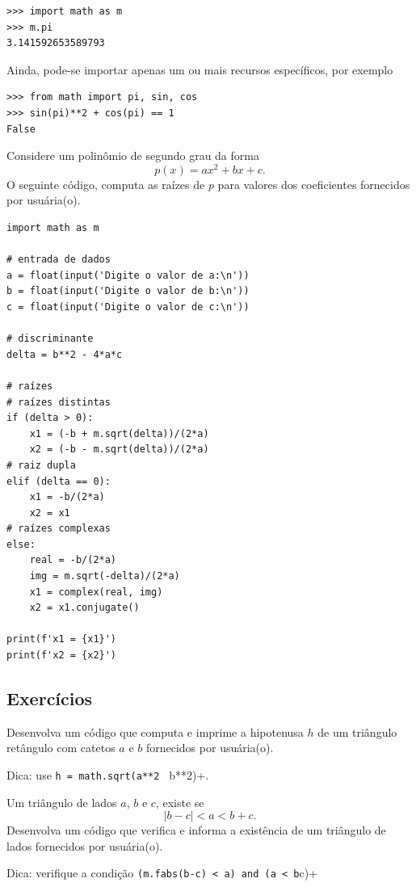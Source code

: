 \begin{lstlisting}
>>> import math as m
>>> m.pi
3.141592653589793
\end{lstlisting}

Ainda, pode-se importar apenas um ou mais recursos específicos, por exemplo

\begin{lstlisting}
>>> from math import pi, sin, cos
>>> sin(pi)**2 + cos(pi) == 1
False
\end{lstlisting}

\begin{ex}
  Considere um polinômio de segundo grau da forma
  \begin{equation}
    p(x) = ax^2 + bx + c.
  \end{equation}
  O seguinte código, computa as raízes de $p$ para valores dos coeficientes fornecidos por usuária(o).

\begin{lstlisting}
import math as m

# entrada de dados
a = float(input('Digite o valor de a:\n'))
b = float(input('Digite o valor de b:\n'))
c = float(input('Digite o valor de c:\n'))

# discriminante
delta = b**2 - 4*a*c

# raízes
# raízes distintas
if (delta > 0):
    x1 = (-b + m.sqrt(delta))/(2*a)
    x2 = (-b - m.sqrt(delta))/(2*a)
# raiz dupla
elif (delta == 0):
    x1 = -b/(2*a)
    x2 = x1
# raízes complexas
else:
    real = -b/(2*a)
    img = m.sqrt(-delta)/(2*a)
    x1 = complex(real, img)
    x2 = x1.conjugate()

print(f'x1 = {x1}')
print(f'x2 = {x2}')
\end{lstlisting}

\end{ex}

\subsection{Exercícios}

\begin{exer}
  Desenvolva um código que computa e imprime a hipotenusa $h$ de um triângulo retângulo com catetos $a$ e $b$ fornecidos por usuária(o).
\end{exer}
\begin{resp}
  Dica: use \lstinline+h = math.sqrt(a**2 + b**2)+.
\end{resp}

\begin{exer}
  Um triângulo de lados $a$, $b$ e $c$, existe se
  \begin{equation}
    |b-c| < a < b + c.
  \end{equation}
  Desenvolva um código que verifica e informa a existência de um triângulo de lados fornecidos por usuária(o).
\end{exer}
\begin{resp}
  Dica: verifique a condição \lstinline+(m.fabs(b-c) < a) and (a < b+c)+
\end{resp}

